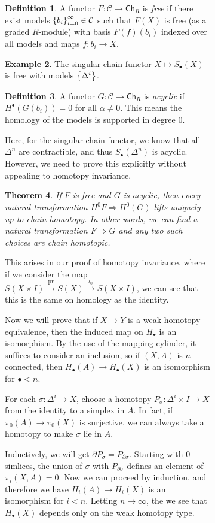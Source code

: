 \documentclass[leqno, openany]{memoir}
\newtheorem{thm}{Theorem}[section]
\theoremstyle{definition}
\newtheorem{defn}[thm]{Definition}
\newtheorem{exm}[thm]{Example}
\theoremstyle{remark}
\theoremstyle{plain}
\theoremstyle{definition}
\theoremstyle{remark}
\newcommand{\mc}[1]{\mathcal{#1}}
\newcommand{\mr}[1]{\mathrm{#1}}
\newcommand{\ms}[1]{\mathsf{#1}}
\begin{document}
\begin{figure}[H]
\begin{figure}[H]
\begin{defn} A functor $F \colon \mc{C} \to \ms{Ch}_R$ is \textit{free} if
    there exist models $\qty{b_i}_{i=0}^{\infty} \in \mc{C}$ such that $F(X)$
    is free (as a graded $R$-module) with basis $F(f) (b_i)$ indexed over all
    models and maps $f \colon b_i \to X$.  \end{defn}

\begin{exm} The singular chain functor $X \mapsto S_{\bullet}(X)$ is free with
models $\qty{\Delta^i}$.  \end{exm}

\begin{defn} A functor $G \colon \mc{C} \to \ms{Ch}_R$ is \textit{acyclic} if
$H^{\bullet} (G(b_i)) = 0$ for all $\alpha \neq 0$. This means the homology of
the models is supported in degree $0$.  \end{defn}

Here, for the singular chain functor, we know that all $\Delta^n$ are
contractible, and thus $S_{\bullet}(\Delta^n)$ is acyclic. However, we need to
prove this explicitly without appealing to homotopy invariance.

\begin{thm} If $F$ is free and $G$ is acyclic, then every natural
    transformation $H^0 F \Rightarrow H^0(G)$ lifts uniquely up to chain
    homotopy. In other words, we can find a natural transformation $F
    \Rightarrow G$ and any two such choices are chain homotopic.  \end{thm}

This arises in our proof of homotopy invariance, where if we consider the map
$S(X \times I) \xrightarrow{\mr{pr}} S(X) \xrightarrow{\iota_0} S(X \times I)$,
we can see that this is the same on homology as the identity.

Now we will prove that if $X \to Y$ is a weak homotopy equivalence, then the
induced map on $H_{\bullet}$ is an isomorphism. By the use of the mapping
cylinder, it suffices to consider an inclusion, so if $(X, A)$ is
$n$-connected, then $H_{\bullet}(A) \to H_{\bullet}(X)$ is an isomorphism for
$\bullet < n$.

For each $\sigma \colon \Delta^i \to X$, choose a homotopy $P_{\sigma} \colon
\Delta^i \times I \to X$ from the identity to a simplex in $A$. In fact, if
$\pi_0(A) \to \pi_0(X)$ is surjective, we can always take a homotopy to make
$\sigma$ lie in $A$.

Inductively, we will get $\partial P_{\sigma} = P_{\partial \sigma}$. Starting
with $0$-simlices, the union of $\sigma$ with $P_{\partial \sigma}$ defines an
element of $\pi_i(X, A) = 0$. Now we can proceed by induction, and therefore we
have $H_i(A) \to H_i(X)$ is an isomorphism for $i < n$. Letting $n \to \infty$,
the we see that $H_{\bullet}(X)$ depends only on the weak homotopy type.


\end{figure}
\end{figure}
\end{document}
